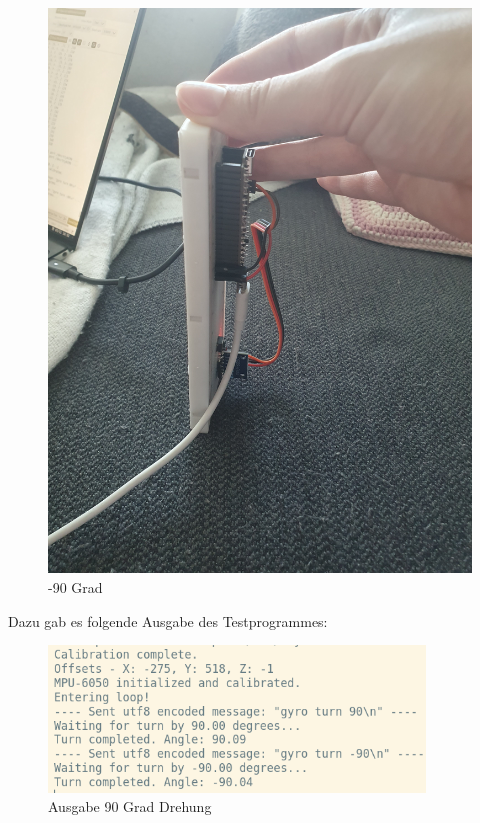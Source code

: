 \begin{figure}[H]
\begin{minipage}[b]{0.29\textwidth}
    \includegraphics[width=\textwidth, angle=-90]{assets/ET/Gyroskop/gyro-90-deg2.jpg}
    \caption{-90 Grad}
    \label{fig:gyro-90}
  \end{minipage}
\end{figure}

Dazu gab es folgende Ausgabe des Testprogrammes:

\begin{figure}[H]
\centering
\includegraphics[width=10cm]{assets/ET/Gyroskop/GyroTest.png}
\caption{Ausgabe 90 Grad Drehung}
\label{img:gyro-tests-base}
\end{figure}

